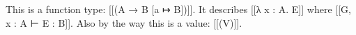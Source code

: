 This is a function type: [[(A → B [a ↦ B])]]. It describes [[λ x : A. E]] where [[G, x : A ⊢ E : B]]. Also by the way this is a value: [[(V)]].
